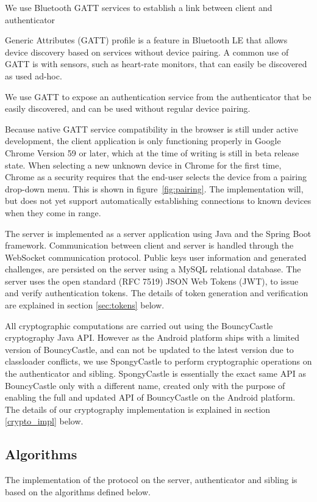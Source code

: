 We use Bluetooth GATT services to establish a link between \gls{client} and \gls{authenticator}

Generic Attributes (GATT) profile is a feature in Bluetooth LE that allows device discovery based on services without device pairing. A common use of GATT is with sensors, such as heart-rate monitors, that can easily be discovered as used ad-hoc.

We use GATT to expose an authentication service from the \gls{authenticator} that be easily discovered, and can be used without regular device pairing.

Because native GATT service compatibility in the browser is still under active development, the \gls{client} application is only functioning properly in Google Chrome Version 59 or later, which at the time of writing is still in beta release state. When selecting a new unknown device in Chrome for the first time, Chrome as a security requires that the end-user selects the device from a pairing drop-down menu. This is shown in figure~\ref{fig:pairing}. The implementation will, but does not yet support automatically establishing connections to known devices when they come in range.

The \gls{server} is implemented as a server application using Java and the Spring Boot framework. Communication between \gls{client} and server is handled through the WebSocket communication protocol. Public keys user information and generated challenges, are persisted on the server using a MySQL relational database. The server uses the open standard (RFC 7519) JSON Web Tokens (JWT), to issue and verify authentication tokens. The details of token generation and verification are explained in section \ref{sec:tokens} below. 

All cryptographic computations are carried out using the BouncyCastle cryptography Java API. However as the Android platform ships with a limited version of BouncyCastle, and can not be updated to the latest version due to classloader conflicts, we use SpongyCastle to perform cryptographic operations on the \gls{authenticator} and \gls{sibling}. SpongyCastle is essentially the exact same API as BouncyCastle only with a different name, created only with the purpose of enabling the full and updated API of BouncyCastle on the Android platform. The details of our cryptography implementation is explained in section \ref{crypto_impl} below.


\subsection{Algorithms} \label{sec:algorithms}
The implementation of the protocol on the \gls{server}, \gls{authenticator} and \gls{sibling} is based on the algorithms defined below.

